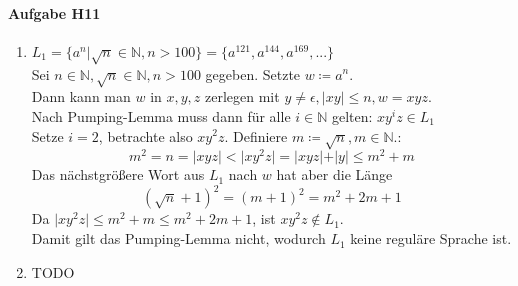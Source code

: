 \documentclass[11pt]{article}
\begin{document}
\paragraph{Aufgabe H11}
\begin{enumerate}[label=\alph*)]
\item $L_1=\{a^{n}|\sqrt{n}\in \mathbb{N}, n>100\}=\{a^{121}, a^{144}, a^{169}, ...\}$\\
Sei $n\in\mathbb{N}, \sqrt{n}\in\mathbb{N}, n>100$ gegeben.
Setzte $w\coloneqq  a^{n}$.\\
Dann kann man $w$ in $x,y,z$ zerlegen mit $y\neq \epsilon, \vert xy \vert \leq n, w=xyz$.\\
Nach Pumping-Lemma muss dann für alle $i \in \mathbb{N}$ gelten: $x y^{i} z \in L_1$\\
Setze $i=2$, betrachte also $x y^{2} z$. Definiere $m\coloneqq \sqrt{n}, m \in \mathbb{N}$.:
\[m^2=n=\vert xyz \vert < \vert x y^2 z \vert = \vert xyz \vert + \vert y \vert \leq m^2 + m\]
Das nächstgrößere Wort aus $L_1$ nach $w$ hat aber die Länge
\[(\sqrt{n}+1)^2=(m+1)^2=m^2+2m+1\]
Da $\vert xy^2z \vert \leq m^2+m \leq m^2+2m+1$, ist $xy^2z \not\in L_1$.\\
Damit gilt das Pumping-Lemma nicht, wodurch $L_1$ keine reguläre Sprache ist.

\item TODO
\end{enumerate}
\end{document}
